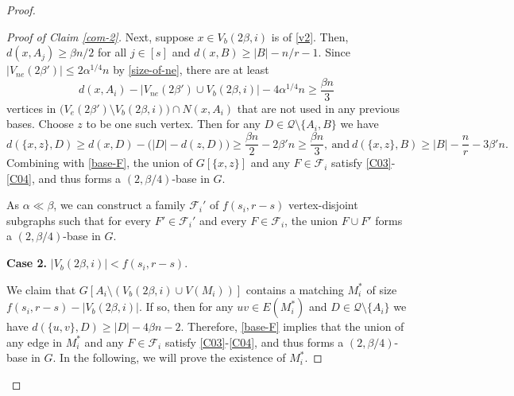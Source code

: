 \documentclass[11pt, a4paper]{article}
\theoremstyle{definition}
\newcommand{\<}{\subseteq}
\begin{document}
\begin{proof}
\begin{proof}[Proof of Claim \ref{com-2}]
Next, suppose $x\in V_{b}(2\beta,i)$ is of \ref{v2}. Then, $d(x,A_j)\ge \beta n/2$ for all $j\in [s]$ and $d(x,B)\ge |B|-n/r-1$. Since $|V_{ne}(2\beta')|\le 2\alpha^{1/4} n$ by \eqref{size-of-ne}, there are at least
$$d(x,A_i)-\big|V_{ne}(2\beta')\cup %
V_b(2\beta,i)\big|-4\alpha^{1/4} n\ge \frac{\beta n}{3}$$
vertices in $\big(V_{e}(2\beta')\setminus V_b(2\beta,i)\big)\cap N(x,  A_i)$ that are not used in any previous bases. %
Choose $z$ to be one such vertex. %
Then for any $D\in \mathcal{Q}\setminus \{A_i,B\}$ we have 
$$d(\{x,z\},D)\ge d(x,D)-\big(|D|-d(z,D)\big)\ge \frac{\beta n}{2}-2\beta'n\ge\frac{\beta n}{3},\ \text{and}\ d(\{x,z\},B)\geq |B|-\frac{n}{r}-3\beta'n.$$
Combining with \eqref{base-F}, the union of $G[\{x,z\}]$ and any $F\in \mathcal{F}_i$ satisfy \ref{C03}-\ref{C04}, and thus forms a $(2,\beta/4)$-base in $G$. %

As $\alpha\ll \beta$, we can construct a family  $\mathcal{F}_i'$ of $f(s_i,r-s)$ vertex-disjoint subgraphs such that for every $F'\in \mathcal{F}_i'$ and every  $F\in\mathcal{F}_i$, the  union $F\cup F'$ forms a $(2,\beta/4)$-base in $G$.  %


\medskip
\textbf{Case 2.} $|V_b(2\beta,i)|< f(s_i,r-s)$.
\medskip

We claim that $G[A_i\setminus (V_b(2\beta,i)\cup V(M_i))]$ contains a matching $M^*_i$ of size $f(s_i,r-s)-|V_{b}(2\beta,i)|$. %
If so,  then for any $uv\in E(M_i^*)$ and $D\in \mathcal{Q}\setminus\{A_i\}$ we have $d(\{u,v\}, D)\ge |D|-4\beta n-2$. Therefore, \eqref{base-F} implies that the union of any edge in $M_i^*$ and any $F\in \mathcal{F}_i$ satisfy \ref{C03}-\ref{C04}, and thus forms a $(2,\beta/4)$-base in $G$. In the following, we will prove the existence of  $M_i^*$.


\end{proof}
\end{proof}
\end{document}
